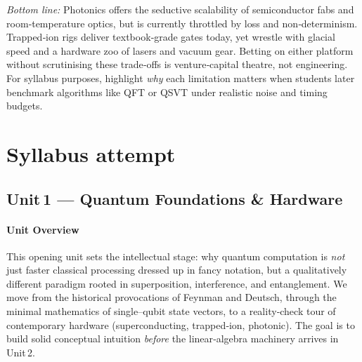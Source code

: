 \documentclass[11pt,a4paper]{article}
\begin{document}
\medskip
\noindent\emph{Bottom line:} Photonics offers the seductive scalability of semiconductor fabs and room‑temperature optics, but is currently throttled by loss and non‑determinism.  Trapped‑ion rigs deliver textbook‑grade gates today, yet wrestle with glacial speed and a hardware zoo of lasers and vacuum gear.  Betting on either platform without scrutinising these trade‑offs is venture‑capital theatre, not engineering.  For syllabus purposes, highlight \emph{why} each limitation matters when students later benchmark algorithms like QFT or QSVT under realistic noise and timing budgets.


\section{Syllabus attempt}

\subsection{Unit 1 — Quantum Foundations \& Hardware}


\paragraph{Unit Overview}
This opening unit sets the intellectual stage: why quantum computation is \emph{not} just faster classical processing dressed up in fancy notation, but a qualitatively different paradigm rooted in superposition, interference, and entanglement.  We move from the historical provocations of Feynman and Deutsch, through the minimal mathematics of single–qubit state vectors, to a reality‑check tour of contemporary hardware (superconducting, trapped‑ion, photonic).  The goal is to build solid conceptual intuition \emph{before} the linear‑algebra machinery arrives in Unit 2.

\end{document}
